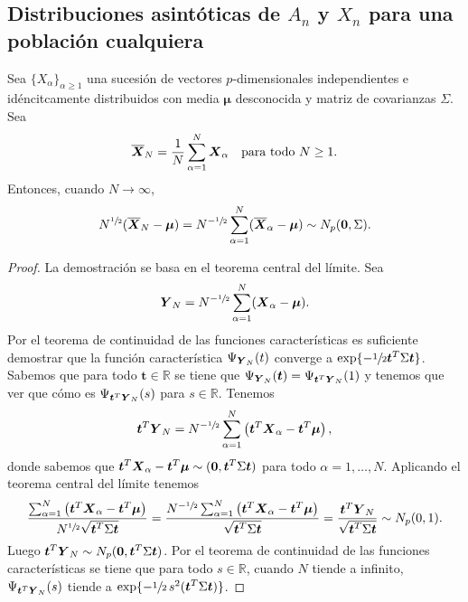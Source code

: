 \subsection{Distribuciones asintóticas de $A_n$ y \(X_n\) para una población cualquiera}

\begin{nprop}
  Sea \(\{X_{\alpha}\}_{\alpha \geq 1}\) una sucesión de vectores \(p\)-dimensionales independientes e idéncitcamente distribuidos con media \(\boldsymbol \mu\) desconocida y matriz de covarianzas \(\Sigma\). Sea \[
    \overline{\boldsymbol{X}}_N = \frac{1}{N}\sum_{\alpha = 1}^{N}\boldsymbol{X}_{\alpha} \quad \text{para todo } N \geq 1.
  \]
  Entonces, cuando \(N \to \infty\), \[
    N^{\sfrac{1}{2}}(\overline{\boldsymbol{X}}_N - \boldsymbol \mu) = N^{-\sfrac{1}{2}}\sum_{\alpha = 1}^{N}(\overline{\boldsymbol{X}}_{\alpha} - \boldsymbol \mu) \sim N_p(\boldsymbol 0, \Sigma).
  \]
\end{nprop}

\begin{proof}
  La demostración se basa en el teorema central del límite.
  Sea \[
  \boldsymbol{Y}_N = N^{-\sfrac{1}{2}} \sum_{\alpha = 1}^N (\boldsymbol{X}_{\alpha} - \boldsymbol \mu).
  \]
  Por el teorema de continuidad de las funciones características es suficiente demostrar que la función característica \(\Psi_{\boldsymbol{Y}_N}(t)\) converge a \(\exp\{-\sfrac{1}{2}\boldsymbol t^T\Sigma\boldsymbol t\}\).
  Sabemos que para todo \(\boldsymbol t \in \mathbb R \) se tiene que \(\Psi_{\boldsymbol{Y}_N}(\boldsymbol t) = \Psi_{\boldsymbol t^T\boldsymbol{Y}_N}(1)\) y tenemos que ver que cómo es \(\Psi_{\boldsymbol t^T \boldsymbol{Y}_N}(s)\) para \(s \in \mathbb R\).
  Tenemos \[
    \boldsymbol t^T\boldsymbol{Y}_N = N^{-\sfrac{1}{2}}\sum_{\alpha = 1}^{N}\left(\boldsymbol t^T\boldsymbol{X}_{\alpha} - \boldsymbol t^T\boldsymbol\mu\right),
  \]
  donde sabemos que \(\boldsymbol t^T \boldsymbol{X}_{\alpha} - \boldsymbol t^T \boldsymbol \mu \sim (\boldsymbol 0, \boldsymbol t^T\Sigma \boldsymbol t)\) para todo \(\alpha = 1, \dots, N\).
  Aplicando el teorema central del límite tenemos \[
    \frac{\sum_{\alpha = 1}^{N}\left(\boldsymbol t^T\boldsymbol{X}_{\alpha} - \boldsymbol t^T\boldsymbol\mu\right)}{N^{\sfrac{1}{2}}\sqrt{\boldsymbol t^T\Sigma \boldsymbol t}} 
    = \frac{N^{-\sfrac{1}{2}}\sum_{\alpha = 1}^{N}\left(\boldsymbol t^T\boldsymbol{X}_{\alpha} - \boldsymbol t^T\boldsymbol\mu\right)}{\sqrt{\boldsymbol t^T\Sigma \boldsymbol t}}
    = \frac{\boldsymbol t^T \boldsymbol{Y}_N}{\sqrt{\boldsymbol t^T\Sigma \boldsymbol t}}
    \sim N_p(0, 1).
  \]
  Luego \(\boldsymbol t^T\boldsymbol{Y}_N \sim N_p(\boldsymbol 0, \boldsymbol t^T \Sigma \boldsymbol t)\). 
  Por el teorema de continuidad de las funciones características se tiene que para todo \(s \in \mathbb R\), cuando \(N\) tiende a infinito, \(\Psi_{\boldsymbol t^T\boldsymbol{Y}_N}(s)\) tiende a \(\exp\{-\sfrac{1}{2}\,s^2(\boldsymbol t^T\Sigma \boldsymbol t)\}\).
\end{proof}

